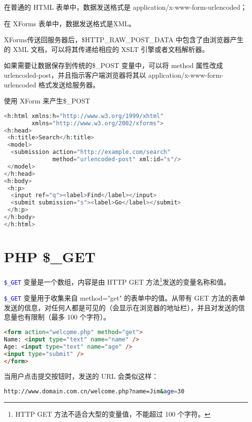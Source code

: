 \begin{compactitem}
\item 在普通的 HTML 表单中，数据发送格式是 application/x-www-form-urlencoded；
\item 在 XForms 表单中，数据发送格式是XML。
\end{compactitem}

XForms传送回服务器后，\$HTTP\_RAW\_POST\_DATA 中包含了由浏览器产生的 XML 文档，可以将其传递给相应的 XSLT 引擎或者文档解析器。

如果需要让数据保存到传统的\$\_POST 变量中，可以将 method 属性改成 urlencoded-post，并且指示客户端浏览器将其以 application/x-www-form-urlencoded 格式发送给服务器。


\begin{example}
使用 XForm 来产生\$\_POST
\begin{lstlisting}[language=PHP]
<h:html xmlns:h="http://www.w3.org/1999/xhtml"
        xmlns="http://www.w3.org/2002/xforms">
<h:head>
 <h:title>Search</h:title>
 <model>
  <submission action="http://example.com/search"
              method="urlencoded-post" xml:id="s"/>
 </model>
</h:head>
<h:body>
 <h:p>
  <input ref="q"><label>Find</label></input>
  <submit submission="s"><label>Go</label></submit>
 </h:p>
</h:body>
</h:html>
\end{lstlisting}
\end{example}

\chapter{PHP \$\_GET}

\textcolor{Blue}{\texttt{\$\_GET}} 变量是一个数组，内容是由 HTTP GET 方法\footnote{HTTP GET 方法不适合大型的变量值，不能超过 100 个字符。}发送的变量名称和值。


\textcolor{Blue}{\texttt{\$\_GET}} 变量用于收集来自 method="get" 的表单中的值。从带有 GET 方法的表单发送的信息，对任何人都是可见的（会显示在浏览器的地址栏），并且对发送的信息量也有限制（最多 100 个字符）。

\begin{lstlisting}[language=HTML]
<form action="welcome.php" method="get">
Name: <input type="text" name="name" />
Age: <input type="text" name="age" />
<input type="submit" />
</form>
\end{lstlisting}

当用户点击提交按钮时，发送的 URL 会类似这样：

\begin{lstlisting}[language=bash]
http://www.domain.com.cn/welcome.php?name=Jim&age=30
\end{lstlisting}


